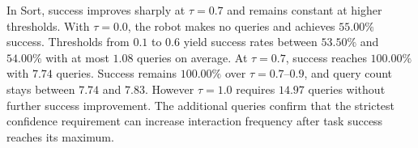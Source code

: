 





In Sort, success improves sharply at $\tau=0.7$ and remains constant at higher thresholds. With $\tau=0.0$, the robot makes no queries and achieves $55.00\%$ success. Thresholds from $0.1$ to $0.6$ yield success rates between $53.50\%$ and $54.00\%$ with at most $1.08$ queries on average. At $\tau=0.7$, success reaches $100.00\%$ with $7.74$ queries. Success remains $100.00\%$ over $\tau=0.7$--$0.9$, and query count stays between $7.74$ and $7.83$. However $\tau=1.0$ requires $14.97$ queries without further success improvement. The additional queries confirm that the strictest confidence requirement can increase interaction frequency after task success reaches its maximum.

